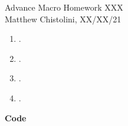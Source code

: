 \documentclass[12pt,oneside,reqno]{amsart}
\begin{document}
\begin{center}
    \Huge{Advance Macro Homework XXX}\\
    \large{Matthew Chistolini, XX/XX/21}
\end{center}
\vspace{-.3cm}
\begin{enumerate}
\item . \\
    
\item .\\
    
\item .\\
    
\item .\\
    
\end{enumerate}
{\bf Code}

% 
\end{document}
